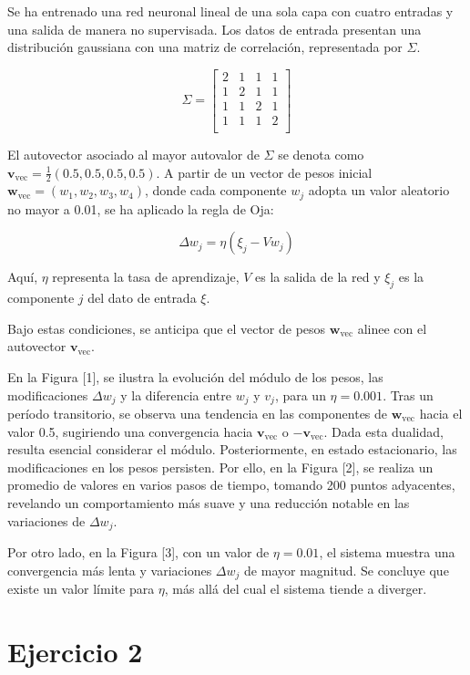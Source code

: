 \documentclass[aps,prb,twocolumn,superscriptaddress,floatfix,longbibliography]{revtex4-2}
\newcounter{para}
\begin{document}
Se ha entrenado una red neuronal lineal de una sola capa con cuatro entradas y una salida de manera no supervisada. Los datos de entrada presentan una distribución gaussiana con una matriz de correlación, representada por $\Sigma$.

\[
\Sigma = \begin{bmatrix}
2 & 1 & 1 & 1 \\
1 & 2 & 1 & 1 \\
1 & 1 & 2 & 1 \\
1 & 1 & 1 & 2 \\
\end{bmatrix}
\]

El autovector asociado al mayor autovalor de $\Sigma$ se denota como $\mathbf{v}_{\text{vec}} = \frac{1}{2}(0.5, 0.5, 0.5, 0.5)$. A partir de un vector de pesos inicial $\mathbf{w}_{\text{vec}} = (w_1, w_2, w_3, w_4)$, donde cada componente $w_j$ adopta un valor aleatorio no mayor a 0.01, se ha aplicado la regla de Oja:

\[
\Delta w_j = \eta ( \xi_j - V w_j )
\]

Aquí, $\eta$ representa la tasa de aprendizaje, $V$ es la salida de la red y $\xi_j$ es la componente $j$ del dato de entrada $\xi$.

Bajo estas condiciones, se anticipa que el vector de pesos $\mathbf{w}_{\text{vec}}$ alinee con el autovector $\mathbf{v}_{\text{vec}}$.

En la Figura [1], se ilustra la evolución del módulo de los pesos, las modificaciones $\Delta w_j$ y la diferencia entre $w_j$ y $v_j$, para un $\eta = 0.001$. Tras un período transitorio, se observa una tendencia en las componentes de $\mathbf{w}_{\text{vec}}$ hacia el valor 0.5, sugiriendo una convergencia hacia $\mathbf{v}_{\text{vec}}$ o $-\mathbf{v}_{\text{vec}}$. Dada esta dualidad, resulta esencial considerar el módulo. Posteriormente, en estado estacionario, las modificaciones en los pesos persisten. Por ello, en la Figura [2], se realiza un promedio de valores en varios pasos de tiempo, tomando 200 puntos adyacentes, revelando un comportamiento más suave y una reducción notable en las variaciones de $\Delta w_j$.

Por otro lado, en la Figura [3], con un valor de $\eta = 0.01$, el sistema muestra una convergencia más lenta y variaciones $\Delta w_j$ de mayor magnitud. Se concluye que existe un valor límite para $\eta$, más allá del cual el sistema tiende a diverger.


\section*{Ejercicio 2}
\end{document}
